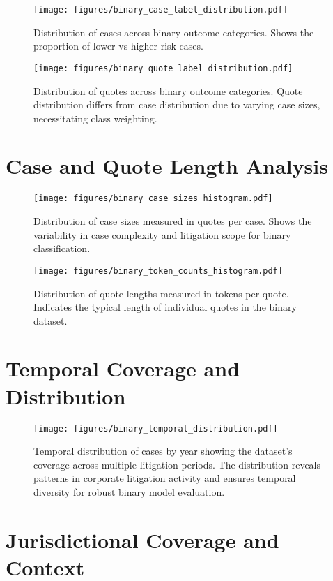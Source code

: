 \documentclass[11pt,a4paper]{article}
\begin{document}
\begin{figure}[H]
\centering
\texttt{[image: figures/binary\_case\_label\_distribution.pdf]}
\caption{Distribution of cases across binary outcome categories. Shows the proportion of lower vs higher risk cases.}
\end{figure}

\begin{figure}[H]
\centering
\texttt{[image: figures/binary\_quote\_label\_distribution.pdf]}
\caption{Distribution of quotes across binary outcome categories. Quote distribution differs from case distribution due to varying case sizes, necessitating class weighting.}
\end{figure}

\section{Case and Quote Length Analysis}

\begin{figure}[H]
\centering
\texttt{[image: figures/binary\_case\_sizes\_histogram.pdf]}
\caption{Distribution of case sizes measured in quotes per case. Shows the variability in case complexity and litigation scope for binary classification.}
\end{figure}

\begin{figure}[H]
\centering
\texttt{[image: figures/binary\_token\_counts\_histogram.pdf]}
\caption{Distribution of quote lengths measured in tokens per quote. Indicates the typical length of individual quotes in the binary dataset.}
\end{figure}

\section{Temporal Coverage and Distribution}

\begin{figure}[H]
\centering
\texttt{[image: figures/binary\_temporal\_distribution.pdf]}
\caption{Temporal distribution of cases by year showing the dataset's coverage across multiple litigation periods. The distribution reveals patterns in corporate litigation activity and ensures temporal diversity for robust binary model evaluation.}
\end{figure}

\section{Jurisdictional Coverage and Context}
\end{document}
